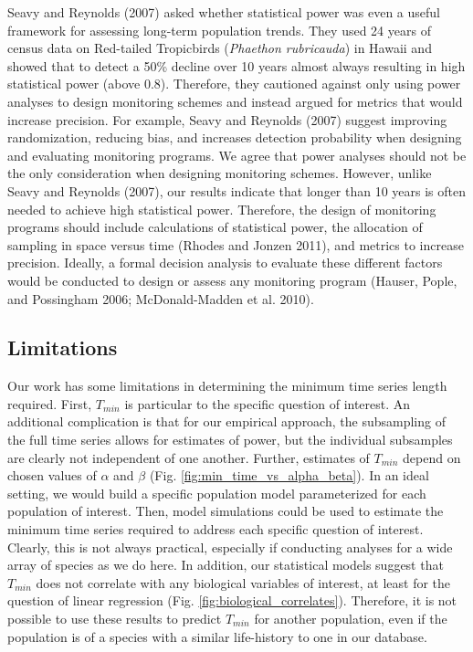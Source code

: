 \documentclass[12pt,]{article}
\begin{document}
Seavy and Reynolds (2007) asked whether statistical power was even a
useful framework for assessing long-term population trends. They used 24
years of census data on Red-tailed Tropicbirds
(\emph{Phaethon rubricauda}) in Hawaii and showed that to detect a 50\%
decline over 10 years almost always resulting in high statistical power
(above 0.8). Therefore, they cautioned against only using power analyses
to design monitoring schemes and instead argued for metrics that would
increase precision. For example, Seavy and Reynolds (2007) suggest
improving randomization, reducing bias, and increases detection
probability when designing and evaluating monitoring programs. We agree
that power analyses should not be the only consideration when designing
monitoring schemes. However, unlike Seavy and Reynolds (2007), our
results indicate that longer than 10 years is often needed to achieve
high statistical power. Therefore, the design of monitoring programs
should include calculations of statistical power, the allocation of
sampling in space versus time (Rhodes and Jonzen 2011), and metrics to
increase precision. Ideally, a formal decision analysis to evaluate
these different factors would be conducted to design or assess any
monitoring program (Hauser, Pople, and Possingham 2006; McDonald-Madden
et al. 2010).

\subsection{Limitations}\label{limitations}

Our work has some limitations in determining the minimum time series
length required. First, \(T_{min}\) is particular to the specific
question of interest. An additional complication is that for our
empirical approach, the subsampling of the full time series allows for
estimates of power, but the individual subsamples are clearly not
independent of one another. Further, estimates of \(T_{min}\) depend on
chosen values of \(\alpha\) and \(\beta\) (Fig.
\ref{fig:min_time_vs_alpha_beta}). In an ideal setting, we would build a
specific population model parameterized for each population of interest.
Then, model simulations could be used to estimate the minimum time
series required to address each specific question of interest. Clearly,
this is not always practical, especially if conducting analyses for a
wide array of species as we do here. In addition, our statistical models
suggest that \(T_{min}\) does not correlate with any biological
variables of interest, at least for the question of linear regression
(Fig. \ref{fig:biological_correlates}). Therefore, it is not possible to
use these results to predict \(T_{min}\) for another population, even if
the population is of a species with a similar life-history to one in our
database.
\end{document}
